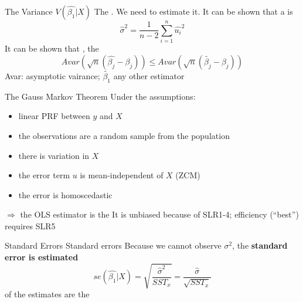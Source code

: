 \begin{frame}{The Variance $V(\widehat{\beta_1}|X)$}
The . We need to estimate it.
\vfill
It can be shown that a  is
\begin{equation}
\hat{\sigma}^2=\frac{1}{n-2}\displaystyle\sum_{i=1}^n \widehat{u_i}^2
\label{eq29}
\end{equation}
\vfill
\pause
It can be shown that , the 
\begin{equation}
Avar \left(\sqrt{n}(\widehat{\beta_j}-\beta_j)\right) \leq Avar \left(\sqrt{n}(\tilde{\beta_j}-\beta_j)\right)
\label{eq30}
\end{equation}
Avar: asymptotic vairance; $\tilde{\beta_1}$ any other estimator
\end{frame}

\begin{frame}{The Gauss Markov Theorem}
Under the assumptions: 
\begin{itemize}
\item {} linear PRF between $y$ and $X$
\item {} the observations are a random sample from the population
\item  {}there is variation in $X$
\item {} the error term $u$ is mean-independent of $X$ (ZCM)
\item {} the error is homoscedastic
\end{itemize}
\vfill
$\Rightarrow$ the OLS estimator is the 
\vfill
\pause
It is unbiased because of SLR1-4; efficiency (``best'') requires SLR5
\end{frame}


\begin{frame}{Standard Errors}
Standard errors  
\vfill
Because we cannot observe $\sigma^2$, the \textbf{standard error is estimated}
\begin{equation}
se(\widehat{\beta_1}|X)=\sqrt{\frac{\widehat{\sigma}^2}{SST_x}}=\frac{\widehat{\sigma}}{\sqrt{SST_x}}
\label{eq31}
\end{equation}
\vfill
\pause
{} of the estimates are the 
\end{frame}


